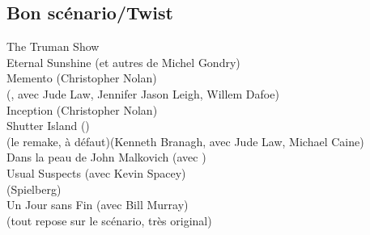 \subsection{Bon scénario/Twist}
The Truman Show \\
Eternal Sunshine (et autres de Michel Gondry) \beau \\
Memento (Christopher Nolan)\\
 (\DavidCronemberg, avec Jude Law, Jennifer Jason Leigh, Willem Dafoe)\\
Inception (Christopher Nolan)\\
Shutter Island (\MartinScorsese)\\
 (le remake, à défaut)(Kenneth Branagh, avec Jude Law, Michael Caine)\\
Dans la peau de John Malkovich (avec \JohnMalkovich)\\
Usual Suspects (avec Kevin Spacey)\\
  (Spielberg)\\
Un Jour sans Fin (avec Bill Murray)\\
  (tout repose sur le scénario, très original)\\


